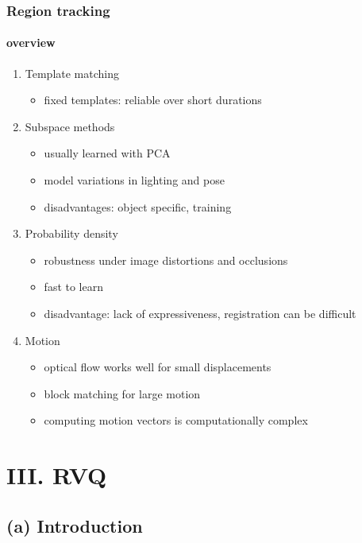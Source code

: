 \begin{frame}
\frametitle{Region tracking}
\framesubtitle{overview}
\logoCSIPCPL\mypagenum
	\begin{enumerate}
		\item Template matching
			\begin{itemize}
				\item fixed templates: reliable over short durations 
			\end{itemize}
		\item Subspace methods
			\begin{itemize}
				\item usually learned with PCA
				\item model variations in lighting and pose
				\item disadvantages: object specific, training
			\end{itemize}			
		\item Probability density
			\begin{itemize}
				\item robustness under image distortions and occlusions
				\item fast to learn
				\item disadvantage: lack of expressiveness, registration can be difficult
			\end{itemize}
		\item Motion
			\begin{itemize}
				\item optical flow works well for small displacements
				\item block matching for large motion
				\item computing motion vectors is computationally complex
			\end{itemize}
	\end{enumerate}
\end{frame}


\section{III. RVQ}
\subsection{(a) Introduction}

